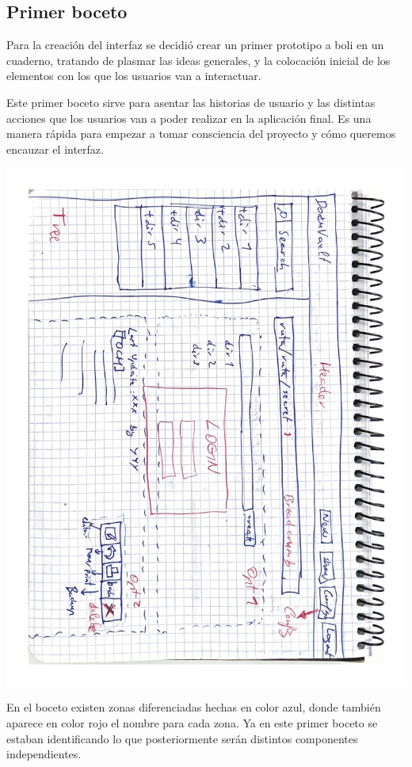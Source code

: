 \documentclass{\ClassPath/viu-tfm-template}
\begin{document}
\subsection{Primer boceto}
Para la creación del interfaz se decidió crear un primer prototipo a boli en un cuaderno, tratando de plasmar las ideas generales, y la colocación inicial de los elementos con los que los usuarios van a interactuar.

Este primer boceto sirve para asentar las historias de usuario y las distintas acciones que los usuarios van a poder realizar en la aplicación final. Es una manera rápida para empezar a tomar consciencia del proyecto y cómo queremos encauzar el interfaz.

\vspace{-20pt}
\begin{center}
    \includegraphics[angle=90,width=0.9\linewidth]{img/boceto.pdf}
    \vspace{-20pt}
\end{center}

En el boceto existen zonas diferenciadas hechas en color azul, donde también aparece en color rojo el nombre para cada zona. Ya en este primer boceto se estaban identificando lo que posteriormente serán distintos componentes independientes.
\end{document}
